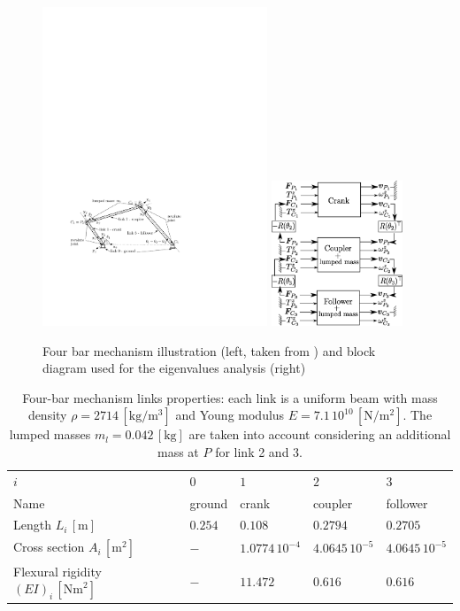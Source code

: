 \documentclass{svjour3}                     %
\begin{document}
\begin{figure}[tb]
	\centering
	\includegraphics[width=0.6\textwidth]{fourbars.pdf} 
	\includegraphics[width=0.35\textwidth]{block_4bars.eps} 
	\caption{Four bar mechanism illustration (left, taken from \cite{Chebbi2017}) and block diagram used for the eigenvalues analysis (right)}
	\label{fig:4bars}
\end{figure}

\begin{table}[bt]
	\caption{Four-bar mechanism links properties: each link is a uniform beam with mass density $\rho=2714\,[\mathrm{kg}/\mathrm{m}^3]$ and Young modulus $E=7.1\,10^{10}\,[\mathrm{N}/\mathrm{m}^2]$. The lumped masses $m_l=0.042\,[\mathrm{kg}]$ are taken into account considering an additional mass at $P$ for link 2 and 3.}
	\label{tab:data_4bars}       %
	\begin{tabular}{lllll}
		\hline\noalign{\smallskip}
		$i$ & $0$ &  $1$ &  $2$ &  $3$  \\
		\noalign{\smallskip}\hline\noalign{\smallskip}
		Name & ground & crank & coupler & follower \\ 
		Length $L_i\,[\mathrm{m}]$ & $0.254$ & $0.108$ & $0.2794$ & $0.2705$\\
		Cross section $A_i\,[\mathrm{m}^2]$ & $-$ & $1.0774\,10^{-4}$ & $4.0645\,10^{-5}$ & $4.0645\,10^{-5}$ \\
		Flexural rigidity $(EI)_i\,[\mathrm{Nm}^2]$ & $-$ & $11.472$ & $0.616$ & $0.616$ \\
		\hline
	\end{tabular}
\end{table}
\end{document}
